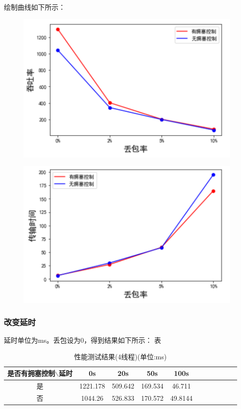 \documentclass[UTF8,a4paper,10pt]{ctexart}
\begin{document}
绘制曲线如下所示：
\begin{figure}[H]
    \centering
    \includegraphics[scale=0.6]{计网9.png}
    \label{fig:9}
\end{figure}
\begin{figure}[H]
    \centering
    \includegraphics[scale=0.6]{计网10.png}
    \label{fig:10}
\end{figure}
\subsubsection{改变延时}
延时单位为ms。丢包设为0，得到结果如下所示：
表
\begin{table}[!htbp]
  \centering
  \begin{tabular}{ccccccccccc}
  \toprule  
  是否有拥塞控制$\backslash$延时& 0s& 20s& 50s& 100s\\
  \midrule
  是& 1221.178& 509.642& 169.534& 46.711\\
  否& 1044.26& 526.833& 170.572& 49.8144\\
  \bottomrule
  \end{tabular}
  \caption{性能测试结果(4线程)(单位:ms)}
\end{table}
\end{document}
